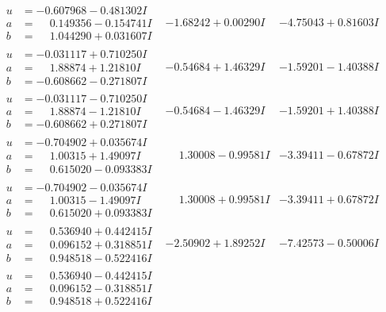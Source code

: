 \documentclass[1p]{elsarticle_modified}
\theoremstyle{definition}
\begin{document}
$$\begin{array}{c|c|c}
 \hline 
\begin{aligned}
u &= -0.607968 - 0.481302 I \\
a &= \phantom{-}0.149356 - 0.154741 I \\
b &= \phantom{-}1.044290 + 0.031607 I\end{aligned}
 & -1.68242 + 0.00290 I & -4.75043 + 0.81603 I \\ \hline\begin{aligned}
u &= -0.031117 + 0.710250 I \\
a &= \phantom{-}1.88874 + 1.21810 I \\
b &= -0.608662 - 0.271807 I\end{aligned}
 & -0.54684 + 1.46329 I & -1.59201 - 1.40388 I \\ \hline\begin{aligned}
u &= -0.031117 - 0.710250 I \\
a &= \phantom{-}1.88874 - 1.21810 I \\
b &= -0.608662 + 0.271807 I\end{aligned}
 & -0.54684 - 1.46329 I & -1.59201 + 1.40388 I \\ \hline\begin{aligned}
u &= -0.704902 + 0.035674 I \\
a &= \phantom{-}1.00315 + 1.49097 I \\
b &= \phantom{-}0.615020 - 0.093383 I\end{aligned}
 & \phantom{-}1.30008 - 0.99581 I & -3.39411 - 0.67872 I \\ \hline\begin{aligned}
u &= -0.704902 - 0.035674 I \\
a &= \phantom{-}1.00315 - 1.49097 I \\
b &= \phantom{-}0.615020 + 0.093383 I\end{aligned}
 & \phantom{-}1.30008 + 0.99581 I & -3.39411 + 0.67872 I \\ \hline\begin{aligned}
u &= \phantom{-}0.536940 + 0.442415 I \\
a &= \phantom{-}0.096152 + 0.318851 I \\
b &= \phantom{-}0.948518 - 0.522416 I\end{aligned}
 & -2.50902 + 1.89252 I & -7.42573 - 0.50006 I \\ \hline\begin{aligned}
u &= \phantom{-}0.536940 - 0.442415 I \\
a &= \phantom{-}0.096152 - 0.318851 I \\
b &= \phantom{-}0.948518 + 0.522416 I\end{aligned}

\end{array}$$
\end{document}
